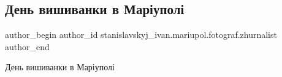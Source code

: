  
 
 
 
 

\subsection{День вишиванки в Маріуполі}
\label{sec:17_05_2018.fb.stanislavskyj_ivan.mariupol.fotograf.zhurnalist.1.den_vyshyvanky_v_mariupoli}

\ifcmt
 author_begin
   author_id stanislavskyj_ivan.mariupol.fotograf.zhurnalist
 author_end
\fi

День вишиванки в Маріуполі

